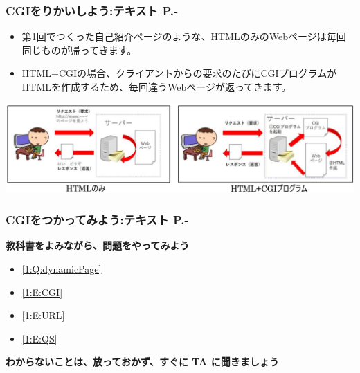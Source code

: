 \documentclass[dvipdfmx]{beamer}
\begin{document}
\begin{frame}[fragile]
	\frametitle{CGIをりかいしよう:テキスト P.\pageref{1:P:CGI}-~~~}
        \begin{itemize}
            \item 第1回でつくった自己紹介ページのような、HTMLのみのWebページは毎回同じものが帰ってきます。
            \item HTML+CGIの場合、クライアントからの要求のたびにCGIプログラムがHTMLを作成するため、毎回違うWebページが返ってきます。
        \end{itemize}
        \begin{minipage}{\textwidth}
            {\upshape
              \includegraphics[width=\textwidth]{slide07-img010.png}}
        \end{minipage}
\end{frame}

\begin{frame}[fragile]
	\frametitle{CGIをつかってみよう:テキスト P.\pageref{1:P:CGI}-~~~}
      \large\textbf{教科書をよみながら、問題をやってみよう}
				\begin{itemize}
					\item \ref*{1:Q:dynamicPage}
					\item \ref*{1:E:CGI}
					\item \ref*{1:E:URL}
					\item \ref*{1:E:QS} 
				\end{itemize}
      \vfill
      \large\textbf{わからないことは、放っておかず、すぐに TA に聞きましょう}
\end{frame}
\end{document}
